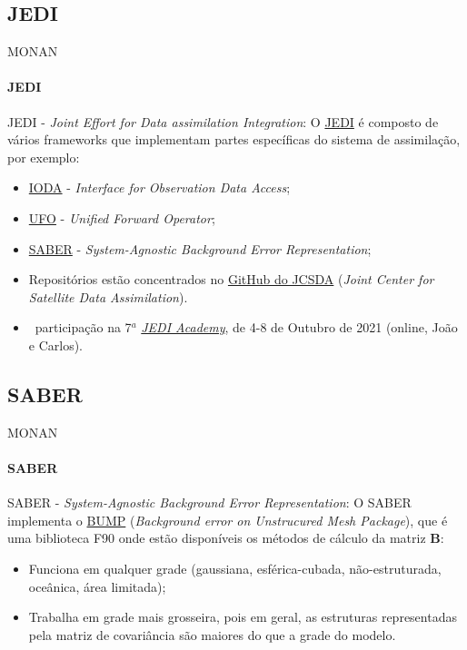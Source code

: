 \documentclass[10pt,aspectratio=169]{beamer}
\begin{document}
\subsection{JEDI}

\begin{frame}[fragile]{MONAN}
\framesubtitle{JEDI \faJedi}
  \begin{block}{JEDI - \textit{Joint Effort for Data assimilation Integration}:}
	  \vspace{0.5em}
    O \href{https://www.jcsda.org/jcsda-project-jedi}{JEDI} é composto de vários frameworks que implementam partes específicas do sistema de assimilação, por exemplo:
    \begin{itemize}
      \item \href{https://github.com/JCSDA/ioda}{IODA} - \textit{Interface for Observation Data Access};
      \item \href{https://github.com/JCSDA/ufo}{UFO} - \textit{Unified Forward Operator};
      \item \href{https://github.com/JCSDA/saber}{SABER} - \textit{System-Agnostic Background Error Representation};
      \pause
      \item Repositórios estão concentrados no \href{https://github.com/orgs/JCSDA/repositories}{GitHub do JCSDA} (\textit{Joint Center for Satellite Data Assimilation}).
    \end{itemize}
    \vspace{1em}
    \pause
    \begin{itemize}
      \item \faUserGraduate~participação na 7$^{a}$ \textit{\href{https://www.jcsda.org/jedi-academies}{JEDI Academy}}, de 4-8 de Outubro de 2021 (online, João e Carlos).
    \end{itemize}
	\end{block}
\end{frame}

\subsection{SABER}

\begin{frame}[fragile]{MONAN}
\framesubtitle{SABER \faRebel}
  \begin{block}{SABER - \textit{System-Agnostic Background Error Representation}:}
	  \vspace{0.5em}
    O SABER implementa o \href{https://github.com/benjaminmenetrier/bump-standalone}{BUMP} (\textit{Background error on Unstrucured Mesh Package}), que é uma biblioteca F90 onde estão disponíveis os métodos de cálculo da matriz $\mathbf{B}$:
    \begin{itemize}
      \item Funciona em qualquer grade (gaussiana, esférica-cubada, não-estruturada, oceânica, área limitada);
      \item Trabalha em grade mais grosseira, pois em geral, as estruturas representadas pela matriz de covariância são maiores do que a grade do modelo.
    \end{itemize}		
	\end{block}
\end{frame}
\end{document}
